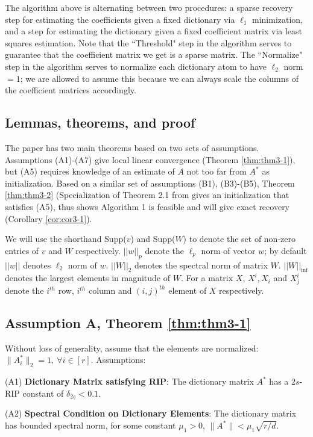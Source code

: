 The algorithm above is alternating between two procedures: a sparse recovery step for estimating the coefficients given a fixed dictionary via $\ell_1$ minimization, and a step for estimating the dictionary given a fixed coefficient matrix via least squares estimation. Note that the ``Threshold" step in the algorithm serves to guarantee that the coefficient matrix we get is a sparse matrix. The ``Normalize" step in the algorithm serves to normalize each dictionary atom to have $\ell_2$ norm $=1$; we are allowed to assume this because we can always scale the columns of the coefficient matrices accordingly. 


\subsection{Lemmas, theorems, and proof}
The paper has two main theorems based on two sets of assumptions. Assumptions (A1)-(A7) give local linear convergence (Theorem \ref{thm:thm3-1}), but (A5) requires knowledge of an estimate of $A$ not too far from $A^*$ as initialization. Based on a similar set of assumptions (B1), (B3)-(B5), Theorem \ref{thm:thm3-2} (Specialization of Theorem 2.1 from \cite{ref1} gives an initialization that satisfies (A5), thus shows Algorithm 1 is feasible and will give exact recovery (Corollary \ref{cor:cor3-1}).

We will use the shorthand Supp($v$) and Supp($W$) to denote the set of non-zero entries of $v$ and $W$ respectively. $||w||_p$ denote the $\ell_p$ norm of vector $w$; by default $||w||$ denotes $\ell_2$ norm of $w$. $||W||_2$ denotes the spectral norm of matrix $W$. $||W||_{\inf}$ denotes the largest elements in magnitude of $W$. For a matrix $X$, $X^i, X_i$ and $X_j^i$ denote the $i^{th}$ row, $i^{th}$ column and $(i, j)^{th}$ element of $X$ respectively. 

\subsection{Assumption A, Theorem \ref{thm:thm3-1}}
Without loss of generality, assume that the elements are normalized: $\lVert A_i^* \rVert_2=1,~\forall i\in[r]$.
Assumptions:

(A1) \textbf{Dictionary Matrix satisfying RIP}: The dictionary matrix $A^*$ has a $2s$-RIP constant of $\delta_{2s}<0.1$.

(A2) \textbf{Spectral Condition on Dictionary Elements}: The dictionary matrix has bounded spectral norm, for some constant $\mu_1>0$, $\lVert A^*\rVert<\mu_1\sqrt{r/d}$.

